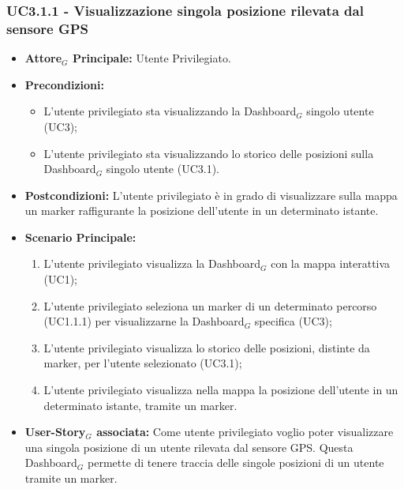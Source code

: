 \documentclass[11pt]{article}
\begin{document}
\begin{justify}
\subsubsection{\textbf{UC3.1.1 - Visualizzazione singola posizione rilevata dal sensore GPS}}
\label{UC3.1.1}
\begin{itemize}
     \item \textbf{Attore$_G$ Principale:} Utente Privilegiato.
     \item \textbf{Precondizioni:}
        \begin{itemize}
    		\item L'utente privilegiato sta visualizzando la Dashboard$_G$ singolo utente (UC3);
    		\item L'utente privilegiato sta visualizzando lo storico delle posizioni sulla Dashboard$_G$ singolo utente (UC3.1).
        \end{itemize}
     \item \textbf{Postcondizioni:} L'utente privilegiato è in grado di visualizzare sulla mappa un marker raffigurante la posizione dell'utente in un determinato istante.
     \item \textbf{Scenario Principale:}
        \begin{enumerate}
            \item L'utente privilegiato visualizza la Dashboard$_G$ con la mappa interattiva (UC1);
            \item L'utente privilegiato seleziona un marker di un determinato percorso (UC1.1.1) per visualizzarne la Dashboard$_G$ specifica (UC3);
            \item L'utente privilegiato visualizza lo storico delle posizioni, distinte da marker, per l'utente selezionato (UC3.1);
            \item L'utente privilegiato visualizza nella mappa la posizione dell'utente in un determinato istante, tramite un marker.
        \end{enumerate}
     \item \textbf{User-Story$_G$ associata:}
     Come utente privilegiato voglio poter visualizzare una singola posizione di un utente rilevata dal sensore GPS. Questa Dashboard$_G$ permette di tenere traccia delle singole posizioni di un utente tramite un marker.
\end{itemize}

\end{justify}
\end{document}

